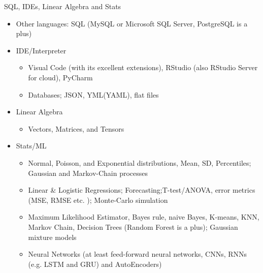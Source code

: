 \documentclass[compress,brown]{beamer}
\begin{document}
\begin{frame}{SQL, IDEs, Linear Algebra and Stats}	
		\begin{itemize}
			\item Other languages: SQL (MySQL or Microsoft SQL Server, PostgreSQL is a plus)
			\item IDE/Interpreter
			\begin{itemize}
				\item Visual Code (with its excellent extensions), RStudio (also RStudio Server for cloud), PyCharm
				\item Databases; JSON, YML(YAML), flat files
			\end{itemize}
		\end{itemize}
	
		\begin{itemize}
	\item Linear Algebra
	\begin{itemize}
		\item Vectors, Matrices, and Tensors
	\end{itemize}
\item Stats/ML
	\begin{itemize}
	\item Normal, Poisson, and Exponential distributions, Mean, SD, Percentiles; Gaussian and Markov-Chain processes
	\item Linear \& Logistic Regressions; Forecasting;T-test/ANOVA, error metrics (MSE, RMSE etc. ); Monte-Carlo simulation
	\item Maximum Likelihood Estimator, Bayes rule, naive Bayes, K-means, KNN, Markov Chain, Decision Trees (Random Forest is a plus); Gaussian mixture models
	\item Neural Networks (at least feed-forward neural networks, CNNs, RNNs (e.g. LSTM and GRU) and AutoEncoders)
\end{itemize}
\end{itemize}		
	\end{frame}
\end{document}
